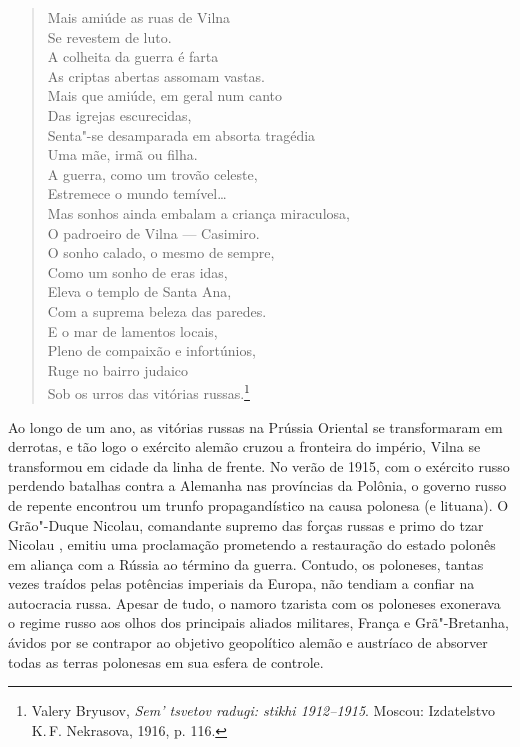 %

\begin{verse}
Mais amiúde as ruas de Vilna\\
Se revestem de luto.\\
A colheita da guerra é farta\\
As criptas abertas assomam vastas.\\[10pt]
Mais que amiúde, em geral num canto\\
Das igrejas escurecidas,\\
Senta"-se desamparada em absorta tragédia\\
Uma mãe, irmã ou filha.\\[10pt]
A guerra, como um trovão celeste,\\
Estremece o mundo temível\ldots{}\\
Mas sonhos ainda embalam a criança miraculosa,\\
O padroeiro de Vilna --- Casimiro.\\[10pt]
O sonho calado, o mesmo de sempre,\\
Como um sonho de eras idas,\\
Eleva o templo de Santa Ana,\\
Com a suprema beleza das paredes.\\[10pt]
E o mar de lamentos locais,\\
Pleno de compaixão e infortúnios,\\
Ruge no bairro judaico\\
Sob os urros das vitórias russas.\footnote{Valery Bryusov, \textit{Sem' tsvetov radugi: stikhi 1912--1915}. Moscou: Izdatelstvo K.\,F. Nekrasova, 1916, p. 116.}
\end{verse}

Ao longo de um ano, as vitórias russas na Prússia Oriental se
transformaram em derrotas, e tão logo o exército alemão cruzou a
fronteira do império, Vilna se transformou em cidade da linha de frente.
No verão de 1915, com o exército russo perdendo batalhas contra a
Alemanha nas províncias da Polônia, o governo russo de repente encontrou
um trunfo propagandístico na causa polonesa (e lituana). O Grão"-Duque
Nicolau, comandante supremo das forças russas e primo do tzar Nicolau
, emitiu uma proclamação prometendo a restauração do estado polonês em
aliança com a Rússia ao término da guerra. Contudo, os poloneses, tantas
vezes traídos pelas potências imperiais da Europa, não tendiam a confiar
na autocracia russa. Apesar de tudo, o namoro tzarista com os poloneses
exonerava o regime russo aos olhos dos principais aliados militares,
França e Grã"-Bretanha, ávidos por se contrapor ao objetivo geopolítico
alemão e austríaco de absorver todas as terras polonesas em sua esfera
de controle.

